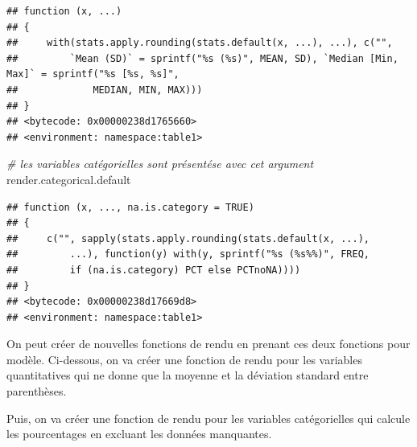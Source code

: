 \documentclass[
]{book}
\newenvironment{Shaded}{\begin{snugshade}}{\end{snugshade}}
\newcommand{\CommentTok}[1]{\textcolor[rgb]{0.56,0.35,0.01}{\textit{#1}}}
\newcommand{\NormalTok}[1]{#1}
\begin{document}
\begin{verbatim}
## function (x, ...) 
## {
##     with(stats.apply.rounding(stats.default(x, ...), ...), c("", 
##         `Mean (SD)` = sprintf("%s (%s)", MEAN, SD), `Median [Min, Max]` = sprintf("%s [%s, %s]", 
##             MEDIAN, MIN, MAX)))
## }
## <bytecode: 0x00000238d1765660>
## <environment: namespace:table1>
\end{verbatim}

\begin{Shaded}
\begin{Highlighting}[]
\CommentTok{\# les variables catégorielles sont présentése avec cet argument}
\NormalTok{render.categorical.default}
\end{Highlighting}
\end{Shaded}

\begin{verbatim}
## function (x, ..., na.is.category = TRUE) 
## {
##     c("", sapply(stats.apply.rounding(stats.default(x, ...), 
##         ...), function(y) with(y, sprintf("%s (%s%%)", FREQ, 
##         if (na.is.category) PCT else PCTnoNA))))
## }
## <bytecode: 0x00000238d17669d8>
## <environment: namespace:table1>
\end{verbatim}

On peut créer de nouvelles fonctions de rendu en prenant ces deux fonctions pour modèle.
Ci-dessous, on va créer une fonction de rendu pour les variables quantitatives qui ne donne que la moyenne et la déviation standard entre parenthèses.

Puis, on va créer une fonction de rendu pour les variables catégorielles qui calcule les pourcentages en excluant les données manquantes.
\end{document}
